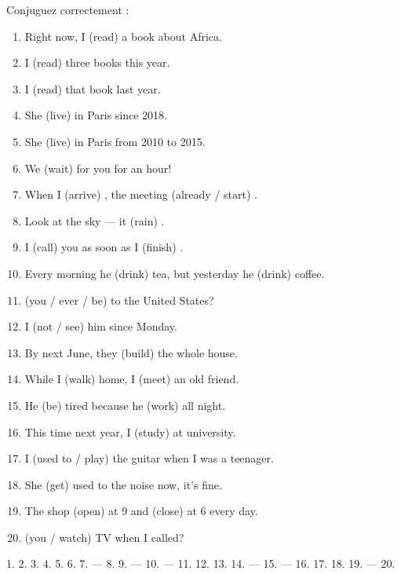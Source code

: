 \begin{exo}
Conjuguez correctement :
\begin{enumerate}
  \item Right now, I (read) \trou[2cm] a book about Africa.
  \item I (read) \trou[2cm] three books this year.
  \item I (read) \trou[2cm] that book last year.
  \item She (live) \trou[2cm] in Paris since 2018.
  \item She (live) \trou[2cm] in Paris from 2010 to 2015.
  \item We (wait) \trou[2.5cm] for you for an hour!
  \item When I (arrive) \trou[2cm], the meeting (already / start) \trou[2.5cm].
  \item Look at the sky --- it (rain) \trou[2.5cm].
  \item I (call) \trou[2cm] you as soon as I (finish) \trou[2cm].
  \item Every morning he (drink) \trou[2cm] tea, but yesterday he (drink) \trou[2cm] coffee.
  \item (you / ever / be) \trou[3cm] to the United States?
  \item I (not / see) \trou[2.5cm] him since Monday.
  \item By next June, they (build) \trou[3cm] the whole house.
  \item While I (walk) \trou[2.5cm] home, I (meet) \trou[2cm] an old friend.
  \item He (be) \trou[2cm] tired because he (work) \trou[3cm] all night.
  \item This time next year, I (study) \trou[3cm] at university.
  \item I (used to / play) \trou[2.5cm] the guitar when I was a teenager.
  \item She (get) \trou[2.5cm] used to the noise now, it's fine.
  \item The shop (open) \trou[2cm] at 9 and (close) \trou[2cm] at 6 every day.
  \item (you / watch) \trou[3cm] TV when I called?
\end{enumerate}
\end{exo}
\begin{corrige}[8.1]
1.  2.  3.   4. 
5.  6.  7.  --- 
8.  9.  --- 
10.  ---  11.  12. 
13.  14.  ---  15.  ---
 16.  17. 
18.  19.  ---  20. 
\end{corrige}


